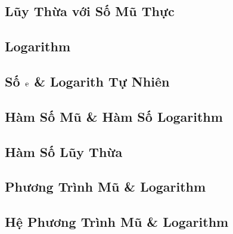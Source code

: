 \documentclass{article}
\numberwithin{equation}{section}
\begin{document}

\subsection{Lũy Thừa với Số Mũ Thực}


\subsection{Logarithm}


\subsection{Số $\rm e$ \& Logarith Tự Nhiên}


\subsection{Hàm Số Mũ \& Hàm Số Logarithm}


\subsection{Hàm Số Lũy Thừa}


\subsection{Phương Trình Mũ \& Logarithm}


\subsection{Hệ Phương Trình Mũ \& Logarithm}

\end{document}
